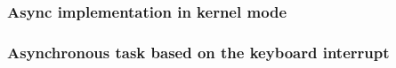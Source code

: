 % 
% 
% 
\begin{frame}[fragile]
    \frametitle{Async implementation in kernel mode}
\end{frame}
% 
% 
% 
% 
% 
% 
% 
% 
\begin{frame}[fragile]
    \frametitle{Asynchronous task based on the keyboard interrupt}
\end{frame}
% 
% 
